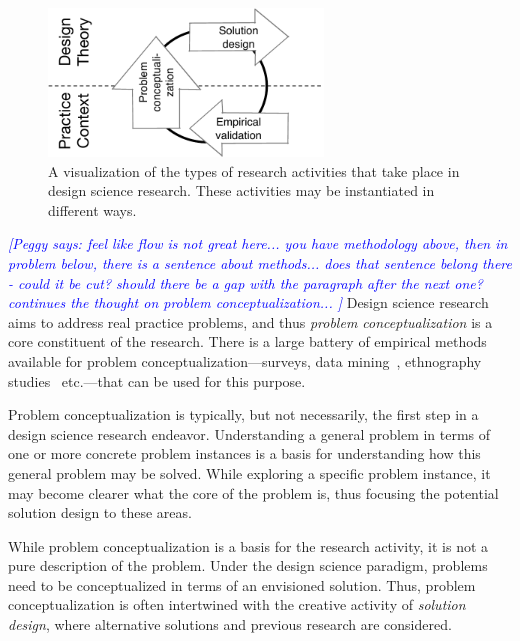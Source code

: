 \documentclass[graybox]{svmult}
\newcommand{\peggy}[1]{\textcolor{blue}{{\it [Peggy says: #1]}}}
\newcommand{\peggy}[1]{}
\begin{document}
\begin{figure}[t]
\centering
 \includegraphics[width=0.65\textwidth]{Figures/DSSE_process.pdf}
\caption{A visualization of the types of research activities that take place in design science research. These activities may be instantiated in different ways.}
\label{fig:DS_process}       %
\end{figure}

\peggy{feel like flow is not great here...  you have methodology above, then in problem below, there is a sentence about methods... does that sentence belong there - could it be cut?  should there be a gap with the paragraph after the next one? continues the thought on problem conceptualization... }
Design science research aims to address real practice problems, and thus \emph{problem conceptualization} is a core constituent of the research. There is a large battery of empirical methods available for problem conceptualization---surveys, data mining~\cite{MenziesDataMining2016}, ethnography studies~\cite{SharpEthnography2016} etc.---that can be used for this purpose. 

Problem conceptualization is typically, but not necessarily, the first step in a design science research endeavor. Understanding a general problem in terms of one or more concrete problem instances is a basis for understanding how this general problem may be solved. While exploring a specific problem instance, it may become clearer what the core of the problem is, thus focusing the potential solution design to these areas. 

While problem conceptualization is a basis for the research activity, it is not a pure description of the problem. Under the design science paradigm, problems need to be conceptualized in terms of an envisioned solution. Thus, problem conceptualization is often intertwined with the creative activity of \emph{solution design}, where alternative solutions and previous research are considered. 
\end{document}
